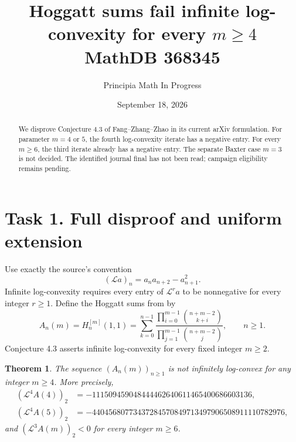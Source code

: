 \documentclass[11pt]{article}
\title{Hoggatt sums fail infinite log-convexity for every $m\ge4$\\\large MathDB 368345}
\author{Principia Math In Progress}
\date{September 18, 2026}
\newtheorem{theorem}{Theorem}
\newcommand{\LL}{\mathcal L}
\begin{document}
\maketitle
\begin{abstract}
We disprove Conjecture 4.3 of Fang--Zhang--Zhao in its current
arXiv formulation. For parameter $m=4$ or $5$, the fourth
log-convexity iterate has a negative entry. For every $m\ge6$,
the third iterate already has a negative entry. The separate Baxter
case $m=3$ is not decided. The identified journal final has not
been read; campaign eligibility remains pending.
\end{abstract}

\section*{Task 1. Full disproof and uniform extension}
Use exactly the source's convention
\[
 (\LL a)_n=a_na_{n+2}-a_{n+1}^2.
\]
Infinite log-convexity requires every entry of $\LL^r a$ to be
nonnegative for every integer $r\ge1$. Define the Hoggatt sums
from \cite[p.~3]{FZZ} by
\[
 A_n(m)=H_n^{[m]}(1,1)=
 \sum_{k=0}^{n-1}
 \frac{\prod_{i=0}^{m-1}\binom{n+m-2}{k+i}}
 {\prod_{j=1}^{m-1}\binom{n+m-2}{j}},\qquad n\ge1.       \tag{1}
\]
Conjecture 4.3 asserts infinite log-convexity for every fixed
integer $m\ge2$.

\begin{theorem}
The sequence $(A_n(m))_{n\ge1}$ is not infinitely log-convex
for any integer $m\ge4$. More precisely,
\[
 \begin{aligned}
 (\LL^4 A(4))_2&=-111509459048444462640611465400686603136,\\
 (\LL^4 A(5))_2&=-44045680773437284570849713497906508911110782976,
 \end{aligned}                                               \tag{2}
\]
and $(\LL^3 A(m))_2<0$ for every integer $m\ge6$.
\end{theorem}
\end{document}
